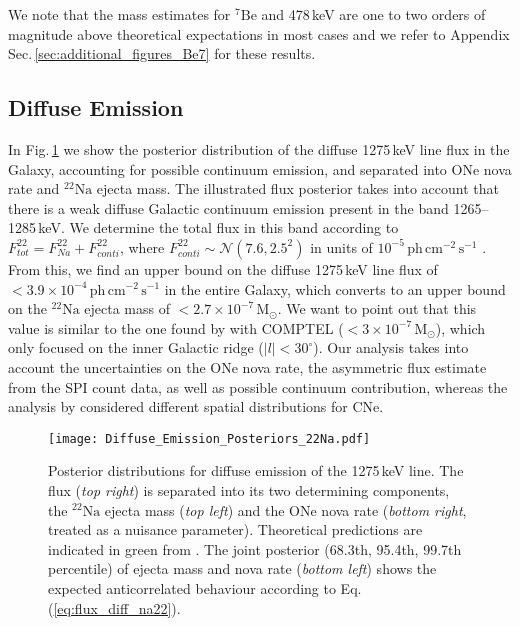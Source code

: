 \documentclass{aa}
\newcommand{\mrm}[1]{\mathrm{#1}}
\newcommand{\nuc}[2]{$\mrm{^{#2}#1}$}
\begin{document}
We note that the mass estimates for \nuc{Be}{7} and 478\,keV are one to two orders of magnitude above theoretical expectations in most cases and we refer to Appendix Sec.\,\ref{sec:additional_figures_Be7} for these results.


\subsection{Diffuse Emission}\label{sec:diffuse_emission_results}
%
In Fig.\,\ref{fig:diffuse_emission_posterior_22Na} we show the posterior distribution of the diffuse 1275\,keV line flux in the Galaxy, accounting for possible continuum emission, and separated into ONe nova rate and \nuc{Na}{22} ejecta mass.
%
The illustrated flux posterior takes into account that there is a weak diffuse Galactic continuum emission present in the band 1265--1285\,keV.
%
We determine the total flux in this band according to $F_{tot}^{22} = F_{Na}^{22} + F_{conti}^{22}$, where $F_{conti}^{22} \sim \mathscr{N}(7.6,2.5^2)$ in units of $10^{-5}\,\mrm{ph\,cm^{-2}\,s^{-1}}$ \citep{Wang2020_Fe60}.
%
From this, we find an upper bound on the diffuse 1275\,keV line flux of $<3.9 \times 10^{-4}\,\mrm{ph\,cm^{-2}\,s^{-1}}$ in the entire Galaxy, which converts to an upper bound on the \nuc{Na}{22} ejecta mass of $<2.7 \times 10^{-7}\,\mrm{M_{\odot}}$.
%
We want to point out that this value is similar to the one found by \citet{Jean2001_ONenovae1275} with COMPTEL ($<3 \times 10^{-7}\,\mrm{M_{\odot}}$), which only focused on the inner Galactic ridge ($|l| < 30^{\circ}$).
%
Our analysis takes into account the uncertainties on the ONe nova rate, the asymmetric flux estimate from the SPI count data, as well as possible continuum contribution, whereas the analysis by \citet{Jean2001_ONenovae1275} considered different spatial distributions for CNe.
%
\begin{figure}[!hbtp]
	\centering
	\texttt{[image: Diffuse\_Emission\_Posteriors\_22Na.pdf]}
	\caption{Posterior distributions for diffuse emission of the 1275\,keV line. The flux (\textit{top right}) is separated into its two determining components, the \nuc{Na}{22} ejecta mass (\textit{top left}) and the ONe nova rate (\textit{bottom right}, treated as a nuisance parameter). Theoretical predictions are indicated in green from \citet{abcdefgh}. The joint posterior (68.3th, 95.4th, 99.7th percentile) of ejecta mass and nova rate (\textit{bottom left}) shows the expected anticorrelated behaviour according to Eq.\,(\ref{eq:flux_diff_na22}).}
	\label{fig:diffuse_emission_posterior_22Na}
\end{figure}
\end{document}
